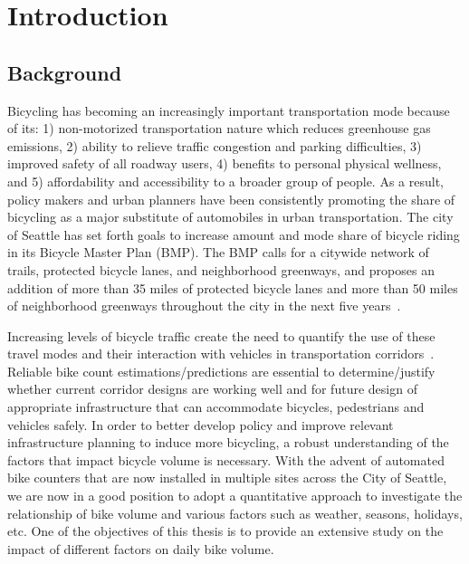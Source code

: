 \documentclass [11pt, proquest] {uwthesis}[2015/03/03]
\begin{document}
%
%

%
 
 
 
%
%
%
\textpages
 
 
\chapter {Introduction}
 
\section{Background}
Bicycling has becoming an increasingly important transportation mode because of its: 1) non-motorized transportation nature which reduces greenhouse gas emissions, 2) ability to relieve traffic congestion and parking difficulties, 3) improved safety of all roadway users, 4) benefits to personal physical wellness, and 5) affordability and accessibility to a broader group of people. As a result, policy makers and urban planners have been consistently promoting the share of bicycling as a major substitute of automobiles in urban transportation. The city of Seattle has set forth goals to increase amount and mode share of bicycle riding in its Bicycle Master Plan (BMP). The BMP calls for a citywide network of trails, protected bicycle lanes, and neighborhood greenways, and proposes an addition of more than 35 miles of protected bicycle lanes and more than 50 miles of neighborhood greenways throughout the city in the next five years~\cite{SDOT_BMP15}.


Increasing levels of bicycle traffic create the need to quantify the use of these travel modes and their interaction with vehicles in transportation corridors~\cite{MNResearch10}. Reliable bike count estimations/predictions are essential to determine/justify whether current corridor designs are working well and for future design of appropriate infrastructure that can accommodate bicycles, pedestrians and vehicles safely. In order to better develop policy and improve relevant infrastructure planning to induce more bicycling, a robust understanding of the factors that impact bicycle volume is necessary. With the advent of automated bike counters that are now installed in multiple sites across the City of Seattle, we are now in a good position to adopt a quantitative approach to investigate the relationship of bike volume and various factors such as weather, seasons, holidays, etc. One of the objectives of this thesis is to provide an extensive study on the impact of different factors on daily bike volume. 
\end{document}
